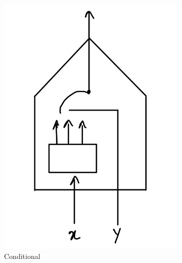 \begin{figure}[htb]
    \centering
    \begin{subfigure}[b]{0.2\textwidth}
        \includegraphics[width=\textwidth]{lectures/07-b/images/6-2.jpg}
        \caption{Conditional}
        \label{fig:energybasedmodel1}
    \end{subfigure}
    \begin{subfigure}[b]{0.2\textwidth}

\end{subfigure}
\end{figure}
